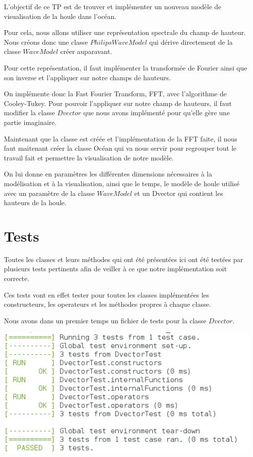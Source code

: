 \documentclass{article}
\begin{document}
L'objectif de ce TP est de trouver et implémenter un nouveau modèle de visualisation de la houle dans l'océan.

Pour cela, nous allons utiliser une représentation spectrale du champ de hauteur. Nous créons donc une classe $PhilipsWaveModel$ qui dérive directement de la classe $WaveModel$ créer auparavant.

Pour cette représentation, il faut implémenter la transformée de Fourier ainsi que son inverse et l'appliquer sur notre champs de hauteurs.

On implémente donc la Fast Fourier Transform, FFT, avec l'algorithme de Cooley-Tukey. Pour pouvoir l'appliquer sur notre champ de hauteurs, il faut modifier la classe $Dvector$ que nous avons implémenté pour qu'elle gère une partie imaginaire.


Maintenant que la classe est créée et l'implémentation de la FFT faite, il nous faut maitenant créer la classe Océan qui va nous servir pour regrouper tout le travail fait et permettre la visualisation de notre modèle.

On lui donne en paramètres les différentes dimensions nécessaires à la modélisation et à la visualisation, ainsi que le temps, le modèle de houle utilisé avec un paramètre de la classe $WaveModel$ et un Dvector qui contient les hauteurs de la houle.

\vspace{1cm}

\section{Tests}

Toutes les classes et leurs méthodes qui ont été présentées ici ont été testées par plusieurs tests pertinents afin de veiller à ce que notre implémentation soit correcte.

Ces tests vont en effet tester pour toutes les classes implémentées les constructeurs, les operateurs et les méthodes propres à chaque classe.

Nous avons dans un premier temps un fichier de tests pour la classe $Dvector$.

\vspace{0.5cm}

\includegraphics[scale=0.7]{./res/Test_Dvector.png}
\end{document}
